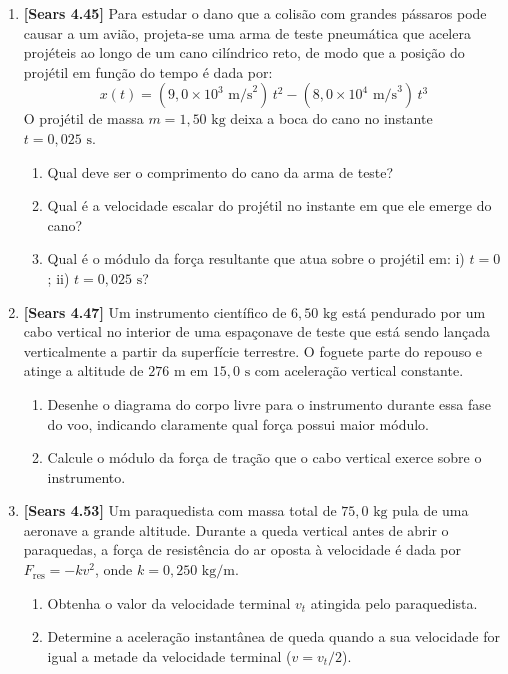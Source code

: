 \documentclass[11pt,a4paper]{article}
\begin{document}
\begin{enumerate}[label=\textbf{\arabic*.}, leftmargin=*, itemsep=0.45cm, resume]

\item \textbf{[Sears 4.45]} Para estudar o dano que a colisão com grandes pássaros pode causar a um avião, projeta-se uma arma de teste pneumática que acelera projéteis ao longo de um cano cilíndrico reto, de modo que a posição do projétil em função do tempo é dada por:
\[ x(t) = (9,0 \times 10^3\text{ m/s}^2)\,t^2 - (8,0 \times 10^4\text{ m/s}^3)\,t^3 \]
O projétil de massa $m = 1,50\text{ kg}$ deixa a boca do cano no instante $t = 0,025\text{ s}$.
\begin{enumerate}[label=\alph*)]
    \item Qual deve ser o comprimento do cano da arma de teste?
    \item Qual é a velocidade escalar do projétil no instante em que ele emerge do cano?
    \item Qual é o módulo da força resultante que atua sobre o projétil em: i) $t = 0$; ii) $t = 0,025\text{ s}$?
\end{enumerate}

\item \textbf{[Sears 4.47]} Um instrumento científico de $6,50\text{ kg}$ está pendurado por um cabo vertical no interior de uma espaçonave de teste que está sendo lançada verticalmente a partir da superfície terrestre. O foguete parte do repouso e atinge a altitude de $276\text{ m}$ em $15,0\text{ s}$ com aceleração vertical constante.
\begin{enumerate}[label=\alph*)]
    \item Desenhe o diagrama do corpo livre para o instrumento durante essa fase do voo, indicando claramente qual força possui maior módulo.
    \item Calcule o módulo da força de tração que o cabo vertical exerce sobre o instrumento.
\end{enumerate}

\item \textbf{[Sears 4.53]} Um paraquedista com massa total de $75,0\text{ kg}$ pula de uma aeronave a grande altitude. Durante a queda vertical antes de abrir o paraquedas, a força de resistência do ar oposta à velocidade é dada por $F_{\text{res}} = -k v^2$, onde $k = 0,250\text{ kg/m}$.
\begin{enumerate}[label=\alph*)]
    \item Obtenha o valor da velocidade terminal $v_t$ atingida pelo paraquedista.
    \item Determine a aceleração instantânea de queda quando a sua velocidade for igual a metade da velocidade terminal ($v = v_t / 2$).
\end{enumerate}


\end{enumerate}
\end{document}
